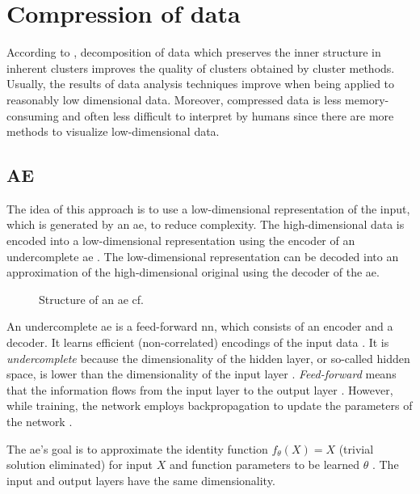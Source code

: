 \section{Compression of data}\label{subsec:compression}

According to \citeauthor{clusteringDocs2020}, decomposition of data which preserves the inner structure in inherent clusters 
improves the quality of clusters obtained by cluster methods.
Usually, the results of data analysis techniques improve when being applied to reasonably low dimensional data.
Moreover, compressed data is less memory-consuming and often less difficult to interpret by humans 
since there are more methods to visualize low-dimensional data.

\subsection{AE}\label{subsec:autoencoder}

The idea of this approach is to use a low-dimensional representation of the input, which is generated by an \ac{ae}, to reduce complexity.
The high-dimensional data is encoded into a low-dimensional representation using the encoder of an undercomplete \ac{ae} \cite{autoencoder2020}.
The low-dimensional representation can be decoded into an approximation of the high-dimensional original using the decoder of the \ac{ae}.

\begin{figure}[h] %
    \centering
    
    \caption[Structure of an \ac{ae}]
    {Structure of an \ac{ae} cf. \cite{autoencoder2020}}
    \label{fig:ae}
\end{figure}

An undercomplete \ac{ae} is a feed-forward \ac{nn}, which consists of an encoder and a decoder.
It learns efficient (non-correlated) encodings of the input data \cite{autoencoder2020}.
It is \textit{undercomplete} because the dimensionality of the hidden layer, or so-called hidden space, 
is lower than the dimensionality of the input layer \cite{seminar_ies}.
\textit{Feed-forward} means that the information flows from the input layer to the output layer \cite{seminar_ies}.
However, while training, the network employs backpropagation to update the parameters of the network \cite{seminar_ies}.

The \ac{ae}'s goal is to approximate the identity function $f_\theta(X) = X$ (trivial solution eliminated) for input $X$ and 
function parameters to be learned $\theta$ \cite{seminar_ies}.
The input and output layers have the same dimensionality.

